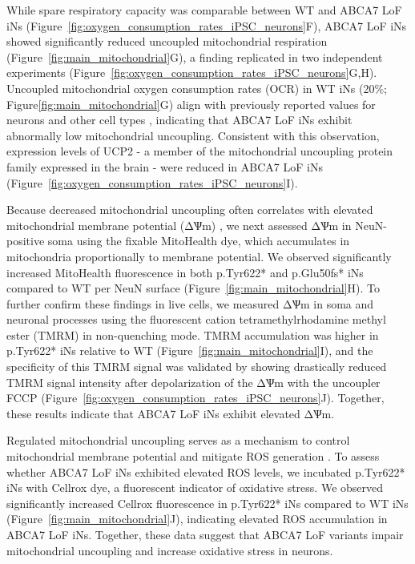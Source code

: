 While spare respiratory capacity was comparable between WT and ABCA7 LoF iNs (Figure~\ref{fig:oxygen_consumption_rates_iPSC_neurons}F), ABCA7 LoF iNs showed significantly reduced uncoupled mitochondrial respiration (Figure~\ref{fig:main_mitochondrial}G), a finding replicated in two independent experiments (Figure~\ref{fig:oxygen_consumption_rates_iPSC_neurons}G,H). Uncoupled mitochondrial oxygen consumption rates (OCR) in WT iNs (20\%; Figure\ref{fig:main_mitochondrial}G) align with previously reported values for neurons and other cell types \cite{Divakaruni2011-uj,Jekabsons2004-fn,Jain2024-br}, indicating that ABCA7 LoF iNs exhibit abnormally low mitochondrial uncoupling. Consistent with this observation, expression levels of UCP2 - a member of the mitochondrial uncoupling protein family expressed in the brain \cite{Kumar2022-bb}- were reduced in ABCA7 LoF iNs (Figure~\ref{fig:oxygen_consumption_rates_iPSC_neurons}I). 

Because decreased mitochondrial uncoupling often correlates with elevated mitochondrial membrane potential (ΔѰm) \cite{Demine2019-yq,Zorov2021-sj}, we next assessed ΔѰm in NeuN-positive soma using the fixable MitoHealth dye, which accumulates in mitochondria proportionally to membrane potential. We observed significantly increased MitoHealth fluorescence in both p.Tyr622* and p.Glu50fs* iNs compared to WT per NeuN surface (Figure~\ref{fig:main_mitochondrial}H). To further confirm these findings in live cells, we measured ΔѰm in soma and neuronal processes using the fluorescent cation tetramethylrhodamine methyl ester (TMRM) in non-quenching mode. TMRM accumulation was higher in p.Tyr622* iNs relative to WT (Figure~\ref{fig:main_mitochondrial}I), and the specificity of this TMRM signal was validated by showing drastically reduced TMRM signal intensity after depolarization of the ΔѰm with the uncoupler FCCP (Figure~\ref{fig:oxygen_consumption_rates_iPSC_neurons}J). Together, these results indicate that ABCA7 LoF iNs exhibit elevated ΔѰm.

Regulated mitochondrial uncoupling serves as a mechanism to control mitochondrial membrane potential and mitigate ROS generation \cite{Monteiro2021-ei,Demine2019-yq}. To assess whether ABCA7 LoF iNs exhibited elevated ROS levels, we incubated p.Tyr622* iNs with Cellrox dye, a fluorescent indicator of oxidative stress. We observed significantly increased Cellrox fluorescence in p.Tyr622* iNs compared to WT iNs (Figure~\ref{fig:main_mitochondrial}J), indicating elevated ROS accumulation in ABCA7 LoF iNs. Together, these data suggest that ABCA7 LoF variants impair mitochondrial uncoupling and increase oxidative stress in neurons.

